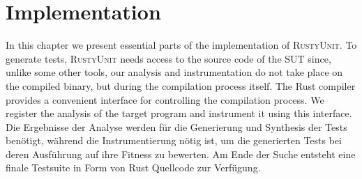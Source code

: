 \documentclass[paper=a4,%
  twoside,%
  BCOR4mm,%
  abstract=true,%
  toc=bibliography,%
  chapterprefix=true,%
  toc=bibliographynumbered,%
  open=right,%
  english,%
  pagesize=pdftex]{scrreprt}
\newcommand{\tech}{\textsc{RustyUnit}\xspace}
\begin{document}

\clearpage
\chapter{Implementation}
\label{chap:implementation}
In this chapter we present essential parts of the implementation of \tech. To generate tests, \tech needs access to the source code of the \ac{SUT} since, unlike some other tools, our analysis and instrumentation do not take place on the compiled binary, but during the compilation process itself. The Rust compiler provides a convenient interface for controlling the compilation process. We register the analysis of the target program and instrument it using this interface. Die Ergebnisse der Analyse werden für die Generierung und Synthesis der Tests benötigt, während die Instrumentierung nötig ist, um die generierten Tests bei deren Ausführung auf ihre Fitness zu bewerten. Am Ende der Suche entsteht eine finale Testsuite in Form von Rust Quellcode zur Verfügung.
\end{document}
